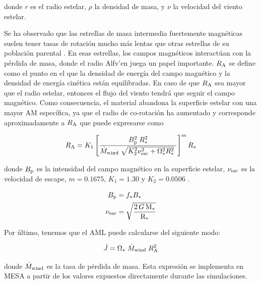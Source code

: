 donde $r$ es el radio estelar, $\rho$ la densidad de masa, y $\nu$ la velocidad del viento estelar.

Se ha observado que las estrellas de masa intermedia fuertemente magnéticas suelen tener tasas de rotación mucho más lentas que otras estrellas de su población parental \cite{Mathys2006}. En esas estrellas, los campos magnéticos interactúan con la pérdida de masa, donde el radio Alfv'{e}n juega un papel importante. $R_{\mathrm{A}}$ se define como el punto en el que la densidad de energía del campo magnético y la densidad de energía cinética están equilibradas. En caso de que $R_{\mathrm{A}}$ sea mayor que el radio estelar, entonces el flujo del viento tendrá que seguir el campo magnético. Como consecuencia, el material abandona la superficie estelar con una mayor AM específica, ya que el radio de co-rotación ha aumentado y corresponde aproximadamente a $R_{\mathrm{A}}$ que puede expresarse como \cite{Matt2012}

\begin{ceqn}
	\begin{equation}
		R_{\mathrm{A}} = K_1\left[\frac{B_{\mathrm{p}}^{2}\;R_*^{2}}{\Dot{M}_{\mathrm{wind}}\;\sqrt{K_2^2\nu_{\mathrm{esc}}^2 + \Omega_*^2R_*^{2}}\ }\right]^{m}R_*  \label{eq:mb_ralfven}
	\end{equation}
\end{ceqn}

donde $B_{\mathrm{p}}$ es la intensidad del campo magnético en la superficie estelar, $\nu_{\mathrm{esc}}$ es la velocidad de escape, $m = 0.1675$, $K_1 = 1.30$ y $K_2 = 0.0506$ \cite{Gallet2013}.

\begin{ceqn}
	\begin{align}
		B_{\mathrm{p}} &= f_*B_* \label{eq:bp}\\
		\nu_{\mathrm{esc}} &= \sqrt{\frac{2\,G\,\mathrm{M}_*}{\mathrm{R}_*}} \label{eq:vesc}
	\end{align}
\end{ceqn}

Por último, tenemos que el AML puede calcularse del siguiente modo:

\begin{ceqn}
	\begin{equation}
		\Dot{J} = \Omega_* \; \Dot{M}_{\mathrm{wind}} \; R_{\mathrm{A}}^{2} \label{eq:j_dot}
	\end{equation}
\end{ceqn}

donde $\Dot{M}_{\mathrm{wind}}$ es la tasa de pérdida de masa. Esta expresión se implementa en MESA a partir de los valores expuestos directamente durante las simulaciones.

